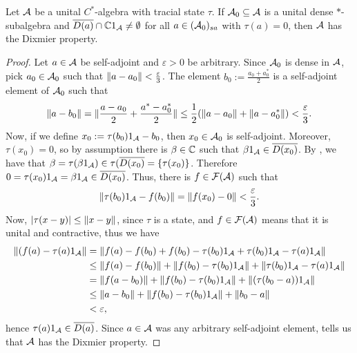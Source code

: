 \begin{lemma}\label{dixmier dense}
Let $\mathcal{A}$ be a unital $C^*$-algebra with tracial state $\tau$. If $\mathcal{A}_0 \subseteq \mathcal{A}$ is a unital dense $*$-subalgebra and $\overline{D(a)} \cap \mathbb{C} 1_{\mathcal{A}} \neq \emptyset$ for all $a \in (\mathcal{A}_0)_{sa}$ with $\tau(a)=0$, then $\mathcal{A}$ has the Dixmier property.
\begin{proof}
Let $a \in \mathcal{A}$ be self-adjoint and $\varepsilon>0$ be arbitrary. Since $\mathcal{A}_0 $ is dense in $\mathcal{A}$, pick $a_0 \in \mathcal{A}_0$ such that $\lVert a- a_0\rVert < \frac{\varepsilon}{3}$. The element $b_0:= \frac{a_0+a_0^*}{2}$ is a self-adjoint element of $\mathcal{A}_0$ such that
\begin{align*}
\lVert a-b_0\rVert= \lVert \frac{a-a_0}{2}+\frac{a^*-a_0^*}{2}\rVert\leq \frac12 (\lVert a-a_0\rVert + \lVert a-a_0^*\rVert) < \frac{\varepsilon}{3}.
\end{align*}
Now, if we define $x_0:= \tau(b_0) 1_{\mathcal{A}}-b_0$, then $x_0 \in \mathcal{A}_0$ is self-adjoint. Moreover, $\tau(x_0)=0$, so by assumption there is $\beta \in \mathbb{C}$ such that $\beta 1_{\mathcal{A}} \in \overline{D(x_0)}$. By , we have that $\beta=\tau(\beta 1_{\mathcal{A}}) \in \tau(\overline{D(x_0)}=\{\tau(x_0)\}$. Therefore $0 = \tau(x_0) 1_{\mathcal{A}}=\beta 1_{\mathcal{A}} \in \overline{D(x_0)}$. Thus, there is $f \in \mathcal{F}(\mathcal{A})$ such that
\begin{align*}
\lVert \tau(b_0) 1_{\mathcal{A}}-f(b_0) \rVert = \lVert f(x_0)-0\rVert < \frac{\varepsilon}{3}.
\end{align*}
Now, $|\tau(x-y)| \leq \lVert x-y\rVert$, since $\tau$ is a state, and $f \in \mathcal{F}(\mathcal{A})$ means that it is unital and contractive, thus we have
\begin{align*}
\lVert (f(a)-\tau(a)1_{\mathcal{A}}\rVert &= \lVert f(a)-f(b_0)+f(b_0)-\tau(b_0)1_{\mathcal{A}}+\tau(b_0)1_{\mathcal{A}}-\tau(a)1_{\mathcal{A}}\rVert \\
&\leq \lVert f(a)-f(b_0) \rVert + \lVert f(b_0)-\tau(b_0)1_{\mathcal{A}}\rVert + \lVert \tau(b_0)1_{\mathcal{A}}-\tau(a)1_{\mathcal{A}}\rVert\\
&= \lVert f(a-b_0) \rVert + \lVert f(b_0)-\tau(b_0)1_{\mathcal{A}}\rVert + \lVert(\tau(b_0-a))1_{\mathcal{A}}\rVert\\
&\leq \lVert a-b_0\rVert + \lVert f(b_0)-\tau(b_0)1_{\mathcal{A}}\rVert + \lVert b_0-a\rVert\\
&< \varepsilon,
\end{align*}
hence $\tau(a) 1_{\mathcal{A}} \in \overline{D(a)}$. Since $a \in \mathcal{A}$ was any arbitrary self-adjoint element,  tells us that $\mathcal{A}$ has the Dixmier property.
\end{proof} 
\end{lemma}

